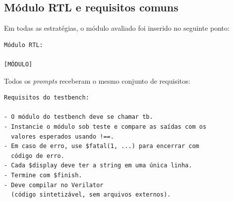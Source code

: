 \subsection{Módulo RTL e requisitos comuns}

Em todas as estratégias, o módulo avaliado foi inserido no seguinte ponto:

\begingroup
\footnotesize
\begin{verbatim}
Módulo RTL:

[MÓDULO]
\end{verbatim}
\endgroup

Todos os \textit{prompts} receberam o mesmo conjunto de requisitos:

\begingroup
\footnotesize
\begin{verbatim}
Requisitos do testbench:

- O módulo do testbench deve se chamar tb.
- Instancie o módulo sob teste e compare as saídas com os
  valores esperados usando !==.
- Em caso de erro, use $fatal(1, ...) para encerrar com
  código de erro.
- Cada $display deve ter a string em uma única linha.
- Termine com $finish.
- Deve compilar no Verilator
  (código sintetizável, sem arquivos externos).
\end{verbatim}
\endgroup
